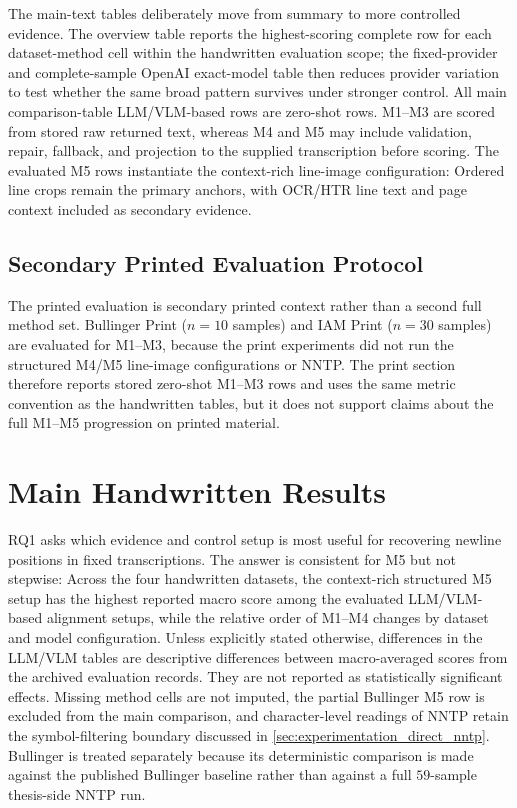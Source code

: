 The main-text tables deliberately move from summary to more controlled evidence. The overview table reports the highest-scoring complete row for each dataset-method cell within the handwritten evaluation scope; the fixed-provider and complete-sample OpenAI exact-model table then reduces provider variation to test whether the same broad pattern survives under stronger control. All main comparison-table LLM/VLM-based rows are zero-shot rows. M1--M3 are scored from stored raw returned text, whereas M4 and M5 may include validation, repair, fallback, and projection to the supplied transcription before scoring. The evaluated M5 rows instantiate the context-rich line-image configuration: Ordered line crops remain the primary anchors, with OCR/HTR line text and page context included as secondary evidence.

\subsection{Secondary Printed Evaluation Protocol}
\label{sec:experimentation_print_protocol}

The printed evaluation is secondary printed context rather than a second full method set. Bullinger Print (\(n=10\) samples) and IAM Print (\(n=30\) samples) are evaluated for M1--M3, because the print experiments did not run the structured M4/M5 line-image configurations or NNTP. The print section therefore reports stored zero-shot M1--M3 rows and uses the same \LANormCombined{} metric convention as the handwritten tables, but it does not support claims about the full M1--M5 progression on printed material.

\section{Main Handwritten Results}
\label{sec:experimentation_handwritten_matrix}

RQ1 asks which evidence and control setup is most useful for recovering newline positions in fixed transcriptions. The answer is consistent for M5 but not stepwise: Across the four handwritten datasets, the context-rich structured M5 setup has the highest reported macro score among the evaluated LLM/VLM-based alignment setups, while the relative order of M1--M4 changes by dataset and model configuration. Unless explicitly stated otherwise, differences in the LLM/VLM tables are descriptive differences between macro-averaged scores from the archived evaluation records. They are not reported as statistically significant effects. Missing method cells are not imputed, the partial Bullinger \QwenThirtyTwoShort{} M5 row is excluded from the main comparison, and character-level readings of NNTP retain the symbol-filtering boundary discussed in \autoref{sec:experimentation_direct_nntp}. Bullinger is treated separately because its deterministic comparison is made against the published Bullinger baseline rather than against a full \(59\)-sample thesis-side NNTP run.

